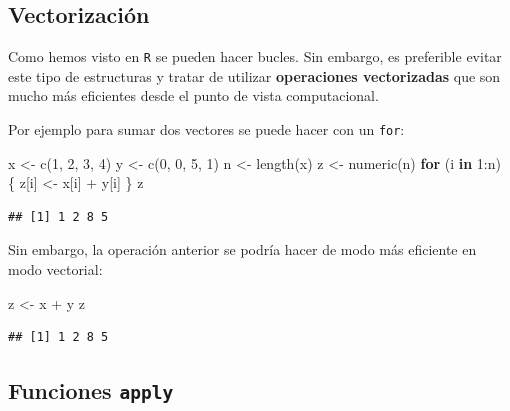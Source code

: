 \documentclass[
]{book}
\newenvironment{Shaded}{\begin{snugshade}}{\end{snugshade}}
\newcommand{\ControlFlowTok}[1]{\textcolor[rgb]{0.13,0.29,0.53}{\textbf{#1}}}
\newcommand{\DecValTok}[1]{\textcolor[rgb]{0.00,0.00,0.81}{#1}}
\newcommand{\FunctionTok}[1]{\textcolor[rgb]{0.00,0.00,0.00}{#1}}
\newcommand{\NormalTok}[1]{#1}
\newcommand{\OtherTok}[1]{\textcolor[rgb]{0.56,0.35,0.01}{#1}}
\newcommand{\SpecialCharTok}[1]{\textcolor[rgb]{0.00,0.00,0.00}{#1}}
\theoremstyle{break}
\begin{document}
\hypertarget{vectorizaciuxf3n}{%
\subsection{Vectorización}\label{vectorizaciuxf3n}}

Como hemos visto en \texttt{R} se pueden
hacer bucles. Sin embargo, es preferible evitar este tipo de estructuras
y tratar de utilizar \textbf{operaciones vectorizadas} que son mucho más
eficientes desde el punto de vista computacional.

Por ejemplo para sumar dos vectores se puede hacer con un \texttt{for}:

\begin{Shaded}
\begin{Highlighting}[]
\NormalTok{x }\OtherTok{\textless{}{-}} \FunctionTok{c}\NormalTok{(}\DecValTok{1}\NormalTok{, }\DecValTok{2}\NormalTok{, }\DecValTok{3}\NormalTok{, }\DecValTok{4}\NormalTok{)}
\NormalTok{y }\OtherTok{\textless{}{-}} \FunctionTok{c}\NormalTok{(}\DecValTok{0}\NormalTok{, }\DecValTok{0}\NormalTok{, }\DecValTok{5}\NormalTok{, }\DecValTok{1}\NormalTok{)}
\NormalTok{n }\OtherTok{\textless{}{-}} \FunctionTok{length}\NormalTok{(x)}
\NormalTok{z }\OtherTok{\textless{}{-}} \FunctionTok{numeric}\NormalTok{(n)}
\ControlFlowTok{for}\NormalTok{ (i }\ControlFlowTok{in} \DecValTok{1}\SpecialCharTok{:}\NormalTok{n) \{}
\NormalTok{  z[i] }\OtherTok{\textless{}{-}}\NormalTok{ x[i] }\SpecialCharTok{+}\NormalTok{ y[i]}
\NormalTok{\}}
\NormalTok{z}
\end{Highlighting}
\end{Shaded}

\begin{verbatim}
## [1] 1 2 8 5
\end{verbatim}

Sin embargo, la operación anterior se podría hacer de modo más eficiente
en modo vectorial:

\begin{Shaded}
\begin{Highlighting}[]
\NormalTok{z }\OtherTok{\textless{}{-}}\NormalTok{ x }\SpecialCharTok{+}\NormalTok{ y}
\NormalTok{z}
\end{Highlighting}
\end{Shaded}

\begin{verbatim}
## [1] 1 2 8 5
\end{verbatim}

\hypertarget{funciones-apply}{%
\subsection{\texorpdfstring{Funciones \texttt{apply}}{Funciones apply}}\label{funciones-apply}}
\end{document}
